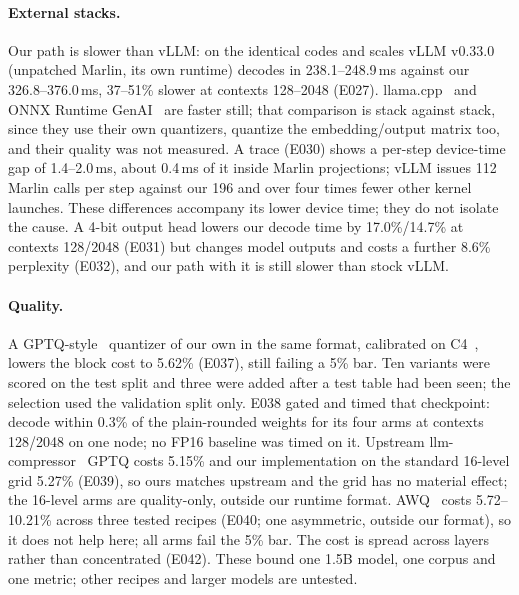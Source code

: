 \documentclass[sigconf,nonacm]{acmart}
\begin{document}
\paragraph{External stacks.} Our path is slower than vLLM: on the identical codes and scales vLLM v0.33.0 (unpatched Marlin, its own runtime) decodes in 238.1--248.9\,ms against our 326.8--376.0\,ms, 37--51\% slower at contexts 128--2048 (E027). llama.cpp~\cite{llamacpp} and ONNX Runtime GenAI~\cite{ortgenai} are faster still; that comparison is stack against stack, since they use their own quantizers, quantize the embedding/output matrix too, and their quality was not measured. A trace (E030) shows a per-step device-time gap of 1.4--2.0\,ms, about 0.4\,ms of it inside Marlin projections; vLLM issues 112 Marlin calls per step against our 196 and over four times fewer other kernel launches. These differences accompany its lower device time; they do not isolate the cause. A 4-bit output head lowers our decode time by 17.0\%/14.7\% at contexts 128/2048 (E031) but changes model outputs and costs a further 8.6\% perplexity (E032), and our path with it is still slower than stock vLLM.

\paragraph{Quality.} A GPTQ-style~\cite{gptq} quantizer of our own in the same format, calibrated on C4~\cite{c4}, lowers the block cost to 5.62\% (E037), still failing a 5\% bar. Ten variants were scored on the test split and three were added after a test table had been seen; the selection used the validation split only. E038 gated and timed that checkpoint: decode within 0.3\% of the plain-rounded weights for its four arms at contexts 128/2048 on one node; no FP16 baseline was timed on it. Upstream llm-compressor~\cite{llmcompressor} GPTQ costs 5.15\% and our implementation on the standard 16-level grid 5.27\% (E039), so ours matches upstream and the grid has no material effect; the 16-level arms are quality-only, outside our runtime format. AWQ~\cite{awq} costs 5.72--10.21\% across three tested recipes (E040; one asymmetric, outside our format), so it does not help here; all arms fail the 5\% bar. The cost is spread across layers rather than concentrated (E042). These bound one 1.5B model, one corpus and one metric; other recipes and larger models are untested.
\end{document}
